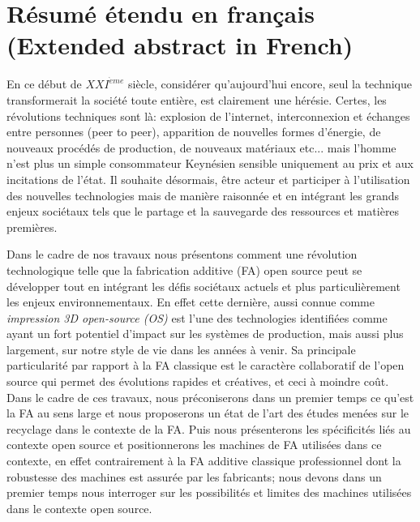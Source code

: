 \chapter{Résumé étendu en français (Extended abstract in French)}
\label{Extended-Abstract}

En ce début de $XXI^{\grave{e}me}$ siècle, considérer qu'aujourd'hui encore, seul la technique transformerait la société toute entière, est clairement une hérésie.
Certes, les révolutions techniques sont là: explosion de l’internet, interconnexion et échanges entre personnes (peer to peer), apparition de nouvelles formes d’énergie, de nouveaux procédés de production, de nouveaux matériaux etc... 
mais l’homme n'est plus un simple consommateur Keynésien sensible uniquement au prix et aux incitations de l’état.
Il souhaite désormais, être acteur et participer à l’utilisation des nouvelles technologies mais de manière raisonnée et en intégrant les grands enjeux sociétaux tels que le partage et la sauvegarde des ressources et matières premières. 


Dans le cadre de nos travaux nous présentons comment une révolution technologique telle que la fabrication additive (FA) open source peut se développer tout en intégrant les défis sociétaux actuels et plus particulièrement les enjeux environnementaux. 
En effet cette dernière, aussi connue comme \textit{impression 3D open-source (OS)} est l'une des technologies identifiées comme ayant un fort potentiel d'impact sur les systèmes de production, mais aussi plus largement, sur notre style de vie dans les années à venir. 
Sa principale particularité par rapport à la FA classique est le caractère collaboratif de l'open source qui permet des évolutions rapides et créatives, et ceci à moindre coût. 
Dans le cadre de ces travaux, nous préconiserons dans un premier temps ce qu'est la FA au sens large et nous proposerons un état de l'art des études menées sur le recyclage dans le contexte de la FA. 
Puis nous présenterons les spécificités liés au contexte open source et positionnerons les machines de FA utilisées dans ce contexte, en effet contrairement à la FA additive classique professionnel dont la robustesse des machines est assurée par les fabricants; nous devons dans un premier temps nous interroger sur les possibilités et limites des machines utilisées dans le contexte open source.  


